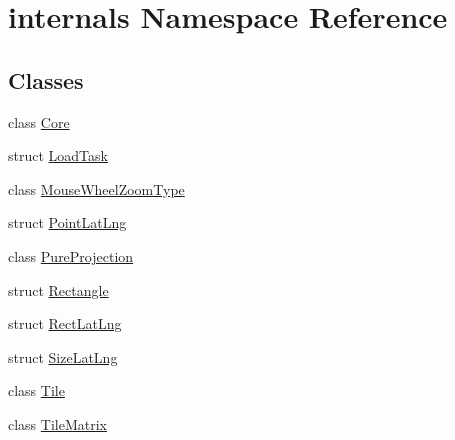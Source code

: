 \hypertarget{namespaceinternals}{\section{internals \-Namespace \-Reference}
\label{namespaceinternals}
}
\subsection*{\-Classes}
\begin{DoxyCompactItemize}
\item 
class \hyperlink{classinternals_1_1_core}{\-Core}
\item 
struct \hyperlink{structinternals_1_1_load_task}{\-Load\-Task}
\item 
class \hyperlink{classinternals_1_1_mouse_wheel_zoom_type}{\-Mouse\-Wheel\-Zoom\-Type}
\item 
struct \hyperlink{structinternals_1_1_point_lat_lng}{\-Point\-Lat\-Lng}
\item 
class \hyperlink{classinternals_1_1_pure_projection}{\-Pure\-Projection}
\item 
struct \hyperlink{structinternals_1_1_rectangle}{\-Rectangle}
\item 
struct \hyperlink{structinternals_1_1_rect_lat_lng}{\-Rect\-Lat\-Lng}
\item 
struct \hyperlink{structinternals_1_1_size_lat_lng}{\-Size\-Lat\-Lng}
\item 
class \hyperlink{classinternals_1_1_tile}{\-Tile}
\item 
class \hyperlink{classinternals_1_1_tile_matrix}{\-Tile\-Matrix}
\end{DoxyCompactItemize}
